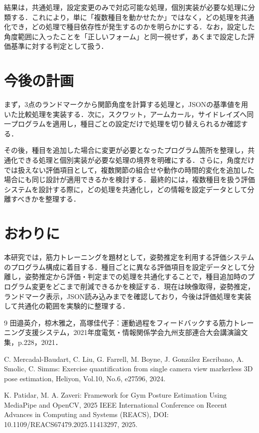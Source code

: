 \documentclass[no-page-number]{nanzan-abstract}
\begin{document}
結果は，共通処理，設定変更のみで対応可能な処理，個別実装が必要な処理に分類する．これにより，単に「複数種目を動かせたか」ではなく，どの処理を共通化でき，どの処理で種目依存性が発生するのかを明らかにする．なお，設定した角度範囲に入ったことを「正しいフォーム」と同一視せず，あくまで設定した評価基準に対する判定として扱う．

\section{今後の計画}
まず，3点のランドマークから関節角度を計算する処理と，JSONの基準値を用いた比較処理を実装する．次に，スクワット，アームカール，サイドレイズへ同一プログラムを適用し，種目ごとの設定だけで処理を切り替えられるか確認する．

その後，種目を追加した場合に変更が必要となったプログラム箇所を整理し，共通化できる処理と個別実装が必要な処理の境界を明確にする．さらに，角度だけでは扱えない評価項目として，複数関節の組合せや動作の時間的変化を追加した場合にも同じ設計が適用できるかを検討する．最終的には，複数種目を扱う評価システムを設計する際に，どの処理を共通化し，どの情報を設定データとして分離すべきかを整理する．

\section{おわりに}
本研究では，筋力トレーニングを題材として，姿勢推定を利用する評価システムのプログラム構成に着目する．種目ごとに異なる評価項目を設定データとして分離し，姿勢推定から評価・判定までの処理を共通化することで，種目追加時のプログラム変更をどこまで削減できるかを検証する．現在は映像取得，姿勢推定，ランドマーク表示，JSON読み込みまでを確認しており，今後は評価処理を実装して共通化の範囲を実験的に整理する．

\balance
\begin{thebibliography}{9}
田邉英介，椋木雅之，高塚佳代子：運動過程をフィードバックする筋力トレーニング支援システム，2021年度電気・情報関係学会九州支部連合大会講演論文集，p.228，2021．

C. Mercadal-Baudart, C. Liu, G. Farrell, M. Boyne, J. González Escribano, A. Smolic, C. Simms: Exercise quantification from single camera view markerless 3D pose estimation, Heliyon, Vol.10, No.6, e27596, 2024.

K. Patidar, M. A. Zaveri: Framework for Gym Posture Estimation Using MediaPipe and OpenCV, 2025 IEEE International Conference on Recent Advances in Computing and Systems (REACS), DOI: 10.1109/REACS67479.2025.11413297, 2025.
\end{thebibliography}
\end{document}
